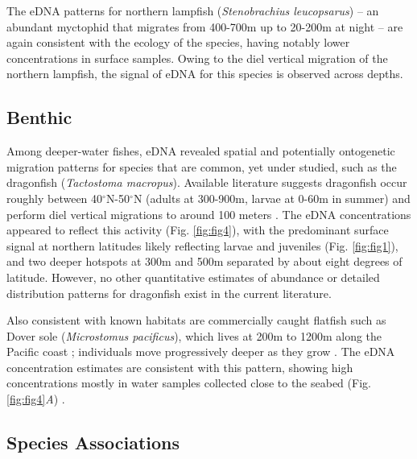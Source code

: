 \documentclass{article}
\begin{document}
The eDNA patterns for northern lampfish (\textit{Stenobrachius leucopsarus}) -- an abundant myctophid that migrates from 400-700m up to 20-200m at night \cite{moku2000,suntsov2008} -- are again consistent with the ecology of the species, having notably lower concentrations in surface samples. Owing to the diel vertical migration of the northern lampfish, the signal of eDNA for this species is observed across depths.

\subsection*{Benthic}
Among deeper-water fishes, eDNA revealed spatial and potentially ontogenetic migration patterns for species that are common, yet under studied, such as the dragonfish (\textit{Tactostoma macropus}). Available literature suggests dragonfish occur roughly between 40$^\circ$N-50$^\circ$N (adults at 300-900m, larvae at 0-60m in summer) \cite{kawaguchi1993} and perform diel vertical migrations to around 100 meters \cite{kawaguchi1993,willis1982}. The eDNA concentrations appeared to reflect this activity (Fig. \ref{fig:fig4}), with the predominant surface signal at northern latitudes likely reflecting larvae and juveniles (Fig. \ref{fig:fig1}), and two deeper hotspots at 300m and 500m separated by about eight degrees of latitude. However, no other quantitative estimates of abundance or detailed distribution patterns for dragonfish exist in the current literature.

Also consistent with known habitats are commercially caught flatfish such as Dover sole (\textit{Microstomus pacificus}), which lives at 200m to 1200m along the Pacific coast \cite{drazen2007,brodziak2000,drazen2012}; individuals move progressively deeper as they grow \cite{vetter1994,hunter1990}. The eDNA concentration estimates are consistent with this pattern, showing high concentrations mostly in water samples collected close to the seabed (Fig. \ref{fig:fig4}\textit{A}) \cite{ono2016}.

\subsection*{Species Associations}
\end{document}
